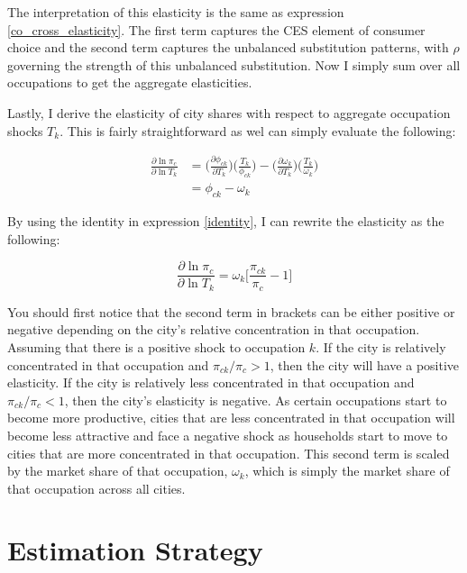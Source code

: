 \documentclass[10pt]{article}
\begin{document}
The interpretation of this elasticity is the same as expression \ref{co_cross_elasticity}. The first term captures the CES element of consumer choice and the second term captures the unbalanced substitution patterns, with $\rho$ governing the strength of this unbalanced substitution. Now I simply sum over all occupations to get the aggregate elasticities.

Lastly, I derive the elasticity of city shares with respect to aggregate occupation shocks $T_k$. This is fairly straightforward as wel can simply evaluate the following:

\begin{align*}
    \frac{\partial\ln{\pi_{c}}}{\partial\ln{T_{k}}} & = \Big(\frac{\partial{\phi_{ck}}}{\partial{T_{k}}}\Big)\Big(\frac{T_{k}}{\phi_{ck}}\Big) - \Big(\frac{\partial{\omega_{k}}}{\partial{T_{k}}}\Big)\Big(\frac{T_{k}}{\omega_{k}}\Big) \\ &= \phi_{ck}-\omega_{k}
\end{align*}

By using the identity in expression \ref{identity}, I can rewrite the elasticity as the following:

\begin{equation}
    \frac{\partial\ln{\pi_{c}}}{\partial\ln{T_{k}}} = {\omega_{k}}\Bigg[\frac{\pi_{ck}}{\pi_{c}}-1\Bigg]
    \label{city_occupation_elasticity}
\end{equation}

You should first notice that the second term in brackets can be either positive or negative depending on the city's relative concentration in that occupation. Assuming that there is a positive shock to occupation $k$. If the city is relatively concentrated in that occupation and $\pi_{ck} / \pi_c > 1$, then the city will have a positive elasticity. If the city is relatively less concentrated in that occupation and $\pi_{ck} / \pi_c < 1$, then the city's elasticity is negative. As certain occupations start to become more productive, cities that are less concentrated in that occupation will become less attractive and face a negative shock as households start to move to cities that are more concentrated in that occupation. This second term is scaled by the market share of that occupation, $\omega_k$, which is simply the market share of that occupation across all cities.

\section{Estimation Strategy}
\end{document}
